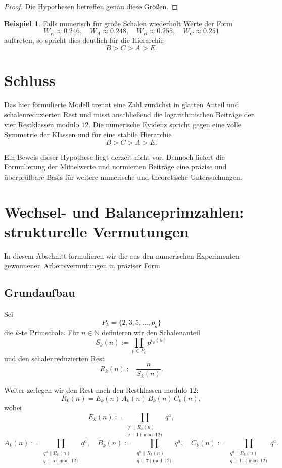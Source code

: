\documentclass[11pt,a4paper]{article}
\theoremstyle{definition}
\newtheorem{beispiel}[satz]{Beispiel}
\theoremstyle{remark}
\begin{document}
	\begin{proof}
		Die Hypothesen betreffen genau diese Größen.
	\end{proof}
	
	\begin{beispiel}
		Falls numerisch für große Schalen wiederholt Werte der Form
		\[
		W_E\approx 0.246,\quad
		W_A\approx 0.248,\quad
		W_B\approx 0.255,\quad
		W_C\approx 0.251
		\]
		auftreten, so spricht dies deutlich für die Hierarchie
		\[
		B>C>A>E.
		\]
	\end{beispiel}
	
	\section{Schluss}
	
	Das hier formulierte Modell trennt eine Zahl zunächst in glatten Anteil und schalenreduzierten
	Rest und misst anschließend die logarithmischen Beiträge der vier Restklassen modulo \(12\).
	Die numerische Evidenz spricht gegen eine volle Symmetrie der Klassen und für eine stabile
	Hierarchie
	\[
	B>C>A>E.
	\]
	
	Ein Beweis dieser Hypothese liegt derzeit nicht vor. Dennoch liefert die Formulierung der
	Mittelwerte und normierten Beiträge eine präzise und überprüfbare Basis für weitere numerische
	und theoretische Untersuchungen.
	\section{Wechsel- und Balanceprimzahlen: strukturelle Vermutungen}
	
	In diesem Abschnitt formulieren wir die aus den numerischen Experimenten gewonnenen
	Arbeitsvermutungen in präziser Form.
	
	\subsection{Grundaufbau}
	
	Sei
	\[
	P_k=\{2,3,5,\dots,p_k\}
	\]
	die \(k\)-te Primschale. Für \(n\in\mathbb N\) definieren wir den Schalenanteil
	\[
	S_k(n):=\prod_{p\in P_k} p^{v_p(n)}
	\]
	und den schalenreduzierten Rest
	\[
	R_k(n):=\frac{n}{S_k(n)}.
	\]
	
	Weiter zerlegen wir den Rest nach den Restklassen modulo \(12\):
	\[
	R_k(n)=E_k(n)\,A_k(n)\,B_k(n)\,C_k(n),
	\]
	wobei
	\[
	E_k(n):=\prod_{\substack{q^a\parallel R_k(n)\\ q\equiv 1\pmod{12}}} q^a,
	\]
	\[
	A_k(n):=\prod_{\substack{q^a\parallel R_k(n)\\ q\equiv 5\pmod{12}}} q^a,
	\quad
	B_k(n):=\prod_{\substack{q^a\parallel R_k(n)\\ q\equiv 7\pmod{12}}} q^a,
	\quad
	C_k(n):=\prod_{\substack{q^a\parallel R_k(n)\\ q\equiv 11\pmod{12}}} q^a.
	\]
	
\end{document}
